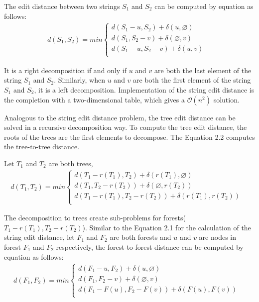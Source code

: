 The edit distance between two strings $S_1$ and $S_2$ can be computed by equation as follows:
\begin{align}
d(S_1, S_2) = min \begin{cases}
	  	d(S_1 - u , S_2) + \delta(u, \varnothing) \\ 
      	d(S_1, S_2 - v) + \delta(\varnothing, v) \\ 
    	d(S_1 - u, S_2 - v) + \delta(u, v) & \\ 
    \end{cases}
\end{align}

It is a right decomposition if and only if $u$ and $v$ are both the last element of the string $S_1$ and $S_2$. Similarly, when $u$ and $v$ are both the first element of the string $S_1$ and $S_2$, it is a left decomposition. Implementation of the string edit distance is the completion with a two-dimensional table, which gives a $\mathcal{O}(n^2)$ solution.

Analogous to the string edit distance problem, the tree edit distance can be solved in a recursive decomposition way. To compute the tree edit distance,  the roots of the trees are the first elements to decompose. The Equation 2.2 computes the tree-to-tree distance.

Let $T_1$ and $T_2$ are both trees, 
\begin{align}
d(T_1, T_2) = min \begin{cases}
	  	d(T_1 - r(T_1) , T_2) + \delta(r(T_1), \varnothing) \\ 
      	d(T_1, T_2 - r(T_2)) + \delta(\varnothing, r(T_2)) \\ 
    	d(T_1 - r(T_1), T_2 - r(T_2)) + \delta(r(T_1), r(T_2)) & \\
    \end{cases}
\end{align}

The decomposition to trees create sub-problems for forests($T_1 - r(T_1), T_2 - r(T_2)$). Similar to the Equation 2.1 for the calculation of the string edit distance, let $F_1$ and $F_2$ are both forests and $u$ and $v$ are nodes in forest $F_1$ and $F_2$ respectively, the forest-to-forest distance can be computed by equation as follows: 
\begin{align}
d(F_1, F_2) = min \begin{cases}
	  	d(F_1 - u , F_2) + \delta(u, \varnothing) \\ 
      	d(F_1, F_2 - v) + \delta(\varnothing, v) \\ 
    	d(F_1 - F(u), F_2 - F(v)) + \delta(F(u), F(v))& \\ 
    \end{cases}
\end{align}

